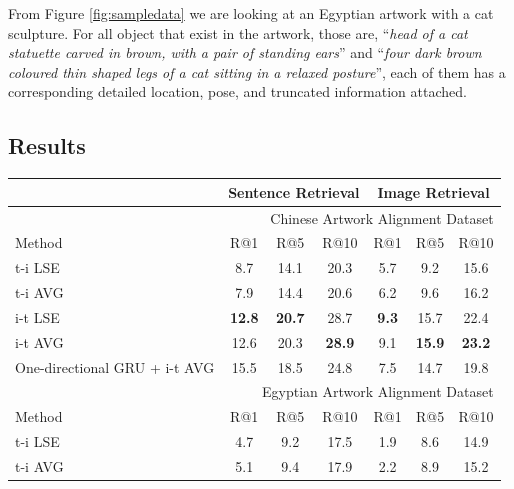 From Figure \ref{fig:sampledata} we are looking at an Egyptian artwork with a cat sculpture. For all object that exist in the artwork, those are, ``\textit{head of a cat statuette carved in brown, with a pair of standing ears}'' and ``\textit{four dark brown coloured thin shaped legs of a cat sitting in a relaxed posture}'', each of them has a corresponding detailed location, pose, and truncated information attached. 

\subsection{Results}


\begin{table}[h!]
\centering
\begin{tabular}{lcccccc}
\hline
\hline
\multicolumn{1}{c}{} & \multicolumn{3}{c}{Sentence Retrieval} & \multicolumn{3}{c}{Image Retrieval} \\ \hline\hline
\multicolumn{7}{r}{Chinese Artwork Alignment Dataset}                                              \\ \hline
Method               & R@1         & R@5         & R@10       & R@1        & R@5        & R@10      \\ \hline
t-i LSE              & 8.7        & 14.1        & 20.3       & 5.7       & 9.2       & 15.6      \\ \hline
t-i AVG              & 7.9        & 14.4        & 20.6       & 6.2       & 9.6       & 16.2      \\ \hline
i-t LSE              & \textbf{12.8}        & \textbf{20.7}        & 28.7       & \textbf{9.3}       & 15.7       & 22.4      \\ \hline
i-t AVG              & 12.6        & 20.3        & \textbf{28.9}       & 9.1       & \textbf{15.9}       & \textbf{23.2}      \\ \hline
One-directional GRU + i-t AVG  & 15.5        & 18.5        & 24.8       & 7.5       & 14.7       & 19.8      \\ \hline\hline
\multicolumn{7}{r}{Egyptian Artwork Alignment Dataset}                                               \\ \hline
Method               & R@1         & R@5         & R@10       & R@1        & R@5        & R@10      \\ \hline
t-i LSE              & 4.7         & 9.2        & 17.5       & 1.9        & 8.6       & 14.9      \\ \hline
t-i AVG              & 5.1         & 9.4        & 17.9       & 2.2        & 8.9       & 15.2      \\ \hline

\end{tabular}
\end{table}
